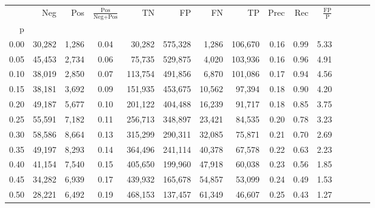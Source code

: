 \begin{tabular}{rrrcrrrrrrrrrrr}
\toprule
{} &     Neg &    Pos & $\frac{\text{Pos}}{\text{Neg}+\text{Pos}}$ &       TN &       FP &       FN &       TP &  Prec &   Rec & $\frac{\text{FP}}{\text{P}}$ \\
p    &         &        &                                            &          &          &          &          &       &       &                              \\
\midrule
0.00 &  30,282 &  1,286 &                                       0.04 &   30,282 &  575,328 &    1,286 &  106,670 &  0.16 &  0.99 &                         5.33 \\
0.05 &  45,453 &  2,734 &                                       0.06 &   75,735 &  529,875 &    4,020 &  103,936 &  0.16 &  0.96 &                         4.91 \\
0.10 &  38,019 &  2,850 &                                       0.07 &  113,754 &  491,856 &    6,870 &  101,086 &  0.17 &  0.94 &                         4.56 \\
0.15 &  38,181 &  3,692 &                                       0.09 &  151,935 &  453,675 &   10,562 &   97,394 &  0.18 &  0.90 &                         4.20 \\
0.20 &  49,187 &  5,677 &                                       0.10 &  201,122 &  404,488 &   16,239 &   91,717 &  0.18 &  0.85 &                         3.75 \\
0.25 &  55,591 &  7,182 &                                       0.11 &  256,713 &  348,897 &   23,421 &   84,535 &  0.20 &  0.78 &                         3.23 \\
0.30 &  58,586 &  8,664 &                                       0.13 &  315,299 &  290,311 &   32,085 &   75,871 &  0.21 &  0.70 &                         2.69 \\
0.35 &  49,197 &  8,293 &                                       0.14 &  364,496 &  241,114 &   40,378 &   67,578 &  0.22 &  0.63 &                         2.23 \\
0.40 &  41,154 &  7,540 &                                       0.15 &  405,650 &  199,960 &   47,918 &   60,038 &  0.23 &  0.56 &                         1.85 \\
0.45 &  34,282 &  6,939 &                                       0.17 &  439,932 &  165,678 &   54,857 &   53,099 &  0.24 &  0.49 &                         1.53 \\
0.50 &  28,221 &  6,492 &                                       0.19 &  468,153 &  137,457 &   61,349 &   46,607 &  0.25 &  0.43 &                         1.27 \\

\end{tabular}
